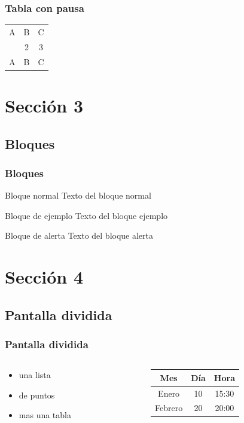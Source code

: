 \documentclass{beamer}
\begin{document}
\begin{frame}
\frametitle{Tabla con pausa}
\begin{tabular}{c c c}
A & B & C \\ \pause 
1 & 2 & 3 \\  \pause 
A & B & C \\ 
\end{tabular} 
\end{frame}

\section{Sección 3}
\subsection{Bloques}

\begin{frame}
\frametitle{Bloques}

\begin{block}{Bloque normal}
Texto del bloque normal
\end{block}

\begin{exampleblock}{Bloque de ejemplo}
Texto del bloque ejemplo
\end{exampleblock}

\begin{alertblock}{Bloque de alerta}
Texto del bloque alerta
\end{alertblock}
\end{frame}

\section{Sección 4}
\subsection{Pantalla dividida}

\begin{frame}
\frametitle{Pantalla dividida}
\begin{columns}
\begin{column}{5cm}
\begin{itemize}
\item una lista
\item de puntos 
\item mas una tabla 
\end{itemize}
\end{column}
\begin{column}{5cm}
\begin{tabular}{|c|c|c|} \hline
\textbf{Mes} & \textbf{Día} & \textbf{Hora} \\ \hline
Enero   & 10 & 15:30 \\ \hline
Febrero & 20 & 20:00 \\ \hline
\end{tabular}
\end{column}
\end{columns}
\end{frame}
\end{document}
